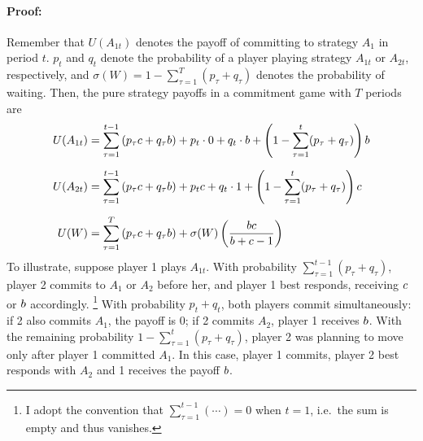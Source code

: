 \documentclass[../paper.tex]{subfiles}
\begin{document}
\paragraph{Proof:}
Remember that $U(A_{1t})$ denotes the payoff of committing to strategy $A_1$ in period $t$. $p_t$ and $q_t$ denote the probability of a player playing strategy $A_{1t}$ or $A_{2t}$, respectively, and $\sigma(W)=1-\sum_{\tau=1}^T(p_\tau+q_\tau)$ denotes the probability of waiting. Then, the pure strategy payoffs in a commitment game with $T$ periods are
\begin{align}
U(A_{1t}) &= \sum_{\tau=1}^{t-1}\left( p_\tau c + q_\tau b \right) + p_t \cdot 0 + q_t \cdot b + \left(1 - \sum_{\tau=1}^{t}(p_\tau + q_\tau)\right) b
\label{eq:U_A1t} \\[6pt]
U(A_{2t}) &= \sum_{\tau=1}^{t-1}\left( p_\tau c + q_\tau b \right) + p_t c + q_t \cdot 1 + \left(1 - \sum_{\tau=1}^{t}(p_\tau + q_\tau) \right) c
\label{eq:U_A2t} \\[6pt]
U(W) &= \sum_{\tau=1}^{T} \left( p_\tau c + q_\tau b \right) + \sigma(W) \left( \frac{bc}{b + c - 1} \right)
\label{eq:U_W}
\end{align}
To illustrate, suppose player 1 plays $A_{1t}$. With probability $\sum_{\tau=1}^{t-1}(p_\tau + q_\tau)$, player 2 commits to $A_1$ or $A_2$ before her, and player 1 best responds, receiving $c$ or $b$ accordingly. 
\footnote{I adopt the convention that $\sum_{\tau=1}^{t-1} (\cdots) = 0$ when $t=1$, i.e.\ the sum is empty and thus vanishes.}
With probability $p_t + q_t$, both players commit simultaneously: if 2 also commits $A_1$, the payoff is $0$; if 2 commits $A_2$, player 1 receives $b$. With the remaining probability $1 - \sum_{\tau=1}^{t}(p_\tau + q_\tau)$, player 2 was planning to move only after player 1 committed $A_1$. In this case, player 1 commits, player 2 best responds with $A_2$ and 1 receives the payoff $b$.
 
\end{document}
